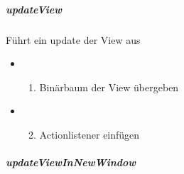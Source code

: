 \documentclass[letterpaper,10pt,ngerman]{sphinxmanual}
\begin{document}
\subparagraph{updateView}
\label{\detokenize{com/linuxluigi/edu/Controller:updateview}}

\begin{fulllineitems}
\label{\detokenize{com/linuxluigi/edu/Controller:com.linuxluigi.edu.Controller.updateView()}}
Führt ein update der View aus
\begin{itemize}
\item {} \begin{enumerate}
\item {} 
Binärbaum der View übergeben

\end{enumerate}

\item {} \begin{enumerate}
\setcounter{enumi}{1}
\item {} 
Actionlistener einfügen

\end{enumerate}

\end{itemize}

\end{fulllineitems}



\subparagraph{updateViewInNewWindow}
\label{\detokenize{com/linuxluigi/edu/Controller:updateviewinnewwindow}}
\end{document}
